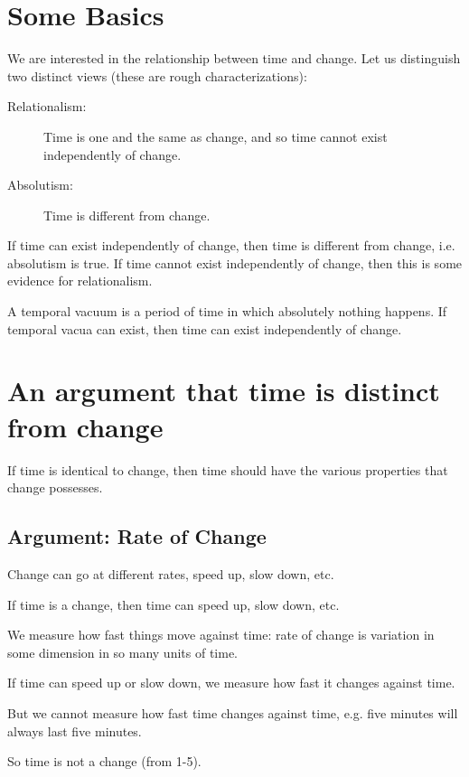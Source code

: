 \documentclass[oneside]{article}
\begin{document}
\thispagestyle{fancy}

\section{Some Basics}

We are interested in the relationship between time and change. Let us distinguish two distinct views (these are rough characterizations):
\begin{description}
\item[Relationalism:] Time is one and the same as change, and so time cannot exist independently of change. 
\item[Absolutism:] Time is different from change.
\end{description}
If time can exist independently of change, then time is different from change, i.e. absolutism is true. If time cannot exist independently of change, then this is some evidence for relationalism. 

A temporal vacuum is a period of time in which absolutely nothing happens. If temporal vacua can exist, then time can exist independently of change.


\section{An argument that time is distinct from change}

If time is identical to change, then time should have the various properties that change possesses. 
\subsection{Argument: Rate of Change}
\begin{enumerate*}
\item Change can go at different rates, speed up, slow down, etc. 
\item If time is a change, then time can speed up, slow down, etc. 
\item We measure how fast things move against time:  rate of change is variation in some dimension in so many units of time.
\item If time can speed up or slow down, we measure how fast it changes against time. 
\item But we cannot measure how fast time changes against time, e.g. five minutes will always last five minutes.  
\item So time is not a change (from 1-5).
\end{enumerate*}
\end{document}
